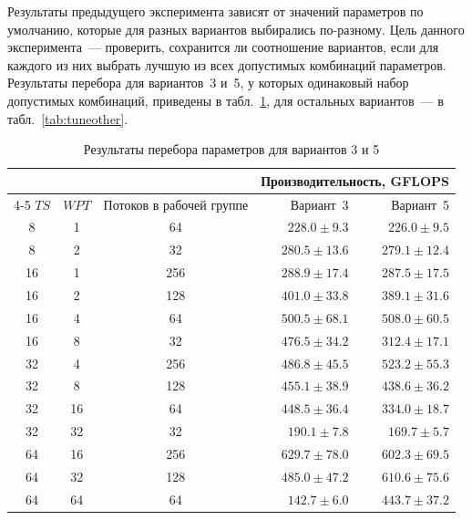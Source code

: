 \documentclass[a4paper]{article}
\begin{document}
Результаты предыдущего эксперимента зависят от значений параметров по
умолчанию, которые для разных вариантов выбирались по-разному.
Цель данного эксперимента~--- проверить, сохранится ли соотношение
вариантов, если для каждого из них выбрать лучшую из всех допустимых
комбинаций параметров. Результаты перебора для вариантов~3 и~5,
у которых одинаковый набор допустимых комбинаций, приведены в
табл.~\ref{tab:tune35}, для остальных вариантов~--- в
табл.~\ref{tab:tuneother}.

\begin{table}[h!]
\centering
\caption{Результаты перебора параметров для вариантов 3 и 5}
\label{tab:tune35}
\begin{tabular}{c c c r r}
\toprule
 & & & \multicolumn{2}{c}{Производительность, GFLOPS} \\
\cmidrule(lr){4-5}
$TS$ & $WPT$ & Потоков в рабочей группе & Вариант~3 & Вариант~5 \\
\midrule
8  & 1  & 64  & $228.0 \pm 9.3$  & $226.0 \pm 9.5$  \\
8  & 2  & 32  & $280.5 \pm 13.6$ & $279.1 \pm 12.4$ \\
16 & 1  & 256 & $288.9 \pm 17.4$ & $287.5 \pm 17.5$ \\
16 & 2  & 128 & $401.0 \pm 33.8$ & $389.1 \pm 31.6$ \\
16 & 4  & 64  & $500.5 \pm 68.1$ & $508.0 \pm 60.5$ \\
16 & 8  & 32  & $476.5 \pm 34.2$ & $312.4 \pm 17.1$ \\
32 & 4  & 256 & $486.8 \pm 45.5$ & $523.2 \pm 55.3$ \\
32 & 8  & 128 & $455.1 \pm 38.9$ & $438.6 \pm 36.2$ \\
32 & 16 & 64  & $448.5 \pm 36.4$ & $334.0 \pm 18.7$ \\
32 & 32 & 32  & $190.1 \pm 7.8$  & $169.7 \pm 5.7$  \\
64 & 16 & 256 & $629.7 \pm 78.0$ & $602.3 \pm 69.5$ \\
64 & 32 & 128 & $485.0 \pm 47.2$ & $610.6 \pm 75.6$ \\
64 & 64 & 64  & $142.7 \pm 6.0$  & $443.7 \pm 37.2$ \\
\bottomrule
\end{tabular}
\end{table}
\end{document}
